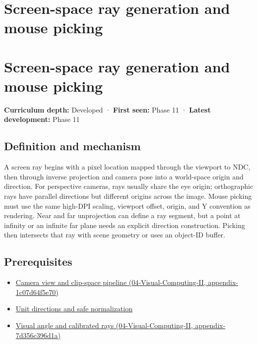 \hypertarget{appendix-f1a6d43e80d1}{}
\section*{Screen-space ray generation and mouse picking}
\section{Screen-space ray generation and mouse picking}\label{appendix-f1a6d43e80d1-screen-space-ray-generation-and-mouse-picking}

\textbf{Curriculum depth:} Developed · \textbf{First seen:} Phase 11 · \textbf{Latest development:} Phase 11

\subsection{Definition and mechanism}\label{appendix-f1a6d43e80d1-definition-and-mechanism}

A screen ray begins with a pixel location mapped through the viewport to NDC, then through inverse projection and camera pose into a world-space origin and direction. For perspective cameras, rays usually share the eye origin; orthographic rays have parallel directions but different origins across the image. Mouse picking must use the same high-DPI scaling, viewport offset, origin, and Y convention as rendering. Near and far unprojection can define a ray segment, but a point at infinity or an infinite far plane needs an explicit direction construction. Picking then intersects that ray with scene geometry or uses an object-ID buffer.

\subsection{Prerequisites}\label{appendix-f1a6d43e80d1-prerequisites}

\begin{itemize}
\tightlist
\item
  \href{../04-Visual-Computing-II/main.pdf\#nameddest=appendix-1c07d64f5e70}{Camera view and clip-space pipeline (04-Visual-Computing-II, appendix-1c07d64f5e70)}
\item
  \hyperref[appendix-f744e41b95b4]{Unit directions and safe normalization}
\item
  \href{../04-Visual-Computing-II/main.pdf\#nameddest=appendix-7d356c396d1a}{Visual angle and calibrated rays (04-Visual-Computing-II, appendix-7d356c396d1a)}
\end{itemize}

